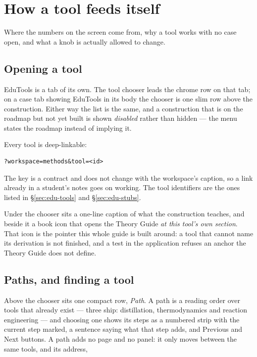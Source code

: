 \documentclass[11pt,a4paper]{article}
\begin{document}
\section{How a tool feeds itself}\label{sec:edu-feeding}

\begin{whatyoulllearn}
Where the numbers on the screen come from, why a tool works with no case
open, and what a knob is actually allowed to change.
\end{whatyoulllearn}

\subsection{Opening a tool}

EduTools is a tab of its own.  The tool chooser leads the chrome row on
that tab; on a case tab showing EduTools in its body the chooser is one
slim row above the construction.  Either way the list is the same, and a
construction that is on the roadmap but not yet built is shown
\emph{disabled} rather than hidden --- the menu states the roadmap instead
of implying it.

Every tool is deep-linkable:

\begin{lstlisting}[language=shell]
?workspace=methods&tool=<id>
\end{lstlisting}

\noindent
The  key is a contract and does not change with the
workspace's caption, so a link already in a student's notes goes on
working.  The tool identifiers are the ones listed in
\S\ref{sec:edu-tools} and \S\ref{sec:edu-stubs}.

Under the chooser sits a one-line caption of what the construction
teaches, and beside it a book icon that opens the Theory Guide \emph{at
this tool's own section}.  That icon is the pointer this whole guide is
built around: a tool that cannot name its derivation is not finished, and
a test in the application refuses an anchor the Theory Guide does not
define.

\subsection{Paths, and finding a tool}

Above the chooser sits one compact row, \emph{Path}.  A path is a reading
order over tools that already exist --- three ship: distillation,
thermodynamics and reaction engineering --- and choosing one shows its
steps as a numbered strip with the current step marked, a sentence saying
what that step adds, and Previous and Next buttons.  A path adds no page
and no panel: it only moves between the same tools, and its address,
\end{document}

